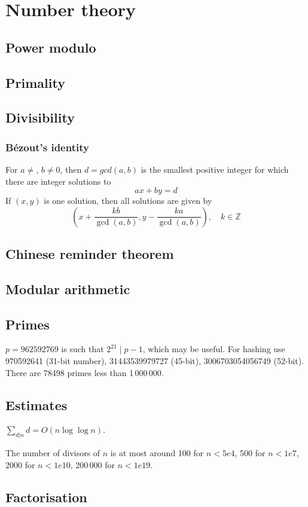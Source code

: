 
\chapter{Number theory}

	\section{Power modulo}

	\section{Primality}

	\section{Divisibility}
		\subsection{Bézout's identity}
		For $a \neq $, $b \neq 0$, then $d=gcd(a,b)$ is the smallest positive integer for which there are integer solutions to
		$$ax+by=d$$
		If $(x,y)$ is one solution, then all solutions are given by
		$$\left(x+\frac{kb}{\gcd(a,b)}, y-\frac{ka}{\gcd(a,b)}\right), \quad k\in\mathbb{Z}$$
		
		

	\section{Chinese reminder theorem}

	\section{Modular arithmetic}

	\section{Primes}
		$p=962592769$ is such that $2^{21} \mid p-1$, which may be useful. For hashing
		use 970592641 (31-bit number), 31443539979727 (45-bit), 3006703054056749
		(52-bit). There are 78498 primes less than 1\,000\,000.

	\section{Estimates}
		$\sum_{d|n} d = O(n \log \log n)$.

		The number of divisors of $n$ is at most around 100 for $n < 5e4$, 500 for $n < 1e7$, 2000 for $n < 1e10$, 200\,000 for $n < 1e19$.

	\section{Factorisation}
